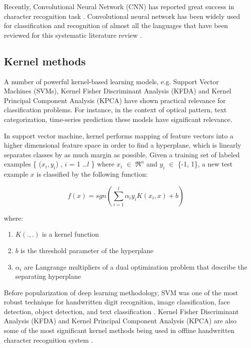 \documentclass{article}
\begin{document}
Recently, Convolutional Neural Network (CNN) has reported great success in character recognition task \cite{liu2005classification}. Convolutional neural network has been widely used for classification and recognition of almost all the languages that have been reviewed for this systematic literature review \cite{boufenar2018investigation,sokar2018generic,lin2018chinese,yang2018recognition,alizadehashraf2017persian,ghasemi2018persian}.





\subsection{Kernel methods}

A number of powerful kernel-based learning models, e.g. Support Vector Machines (SVMs), Kernel Fisher Discriminant Analysis (KFDA) and Kernel Principal Component Analysis (KPCA) have shown practical relevance for classification problems. For instance, in the context of optical pattern, text categorization, time-series prediction these models have significant relevance. 



In support vector machine, kernel performs mapping of feature vectors into a higher dimensional feature space in order to find a hyperplane, which is linearly separates classes by as much margin as possible. Given a training set of labeled examples \{ ($x_i, y_i$) , $i$ = 1 \dots $l$ \} where $x_i$ $\in$ $\Re^n$ and $y_i$ $\in$ \{-1, 1\}, a new test example $x$ is classified by the following function:


\begin{equation}
f(x)=sgn(\sum\limits_{i=1}^{l} \alpha_i y_i K(x_i,x)+b)
\end{equation}

where:
\begin {enumerate}
\item $K(.,.)$ is a kernel function
\item $b$ is the threshold parameter of the hyperplane
\item $\alpha_i$ are Langrange multipliers of a dual optimization problem that describe the separating hyperplane
\end {enumerate}


Before popularization of deep learning methodology, SVM was one of the most robust technique for handwritten digit recognition, image classification, face detection, object detection, and text classification \cite{boukharouba2017novel}. Kernel Fisher Discriminant Analysis (KFDA) and Kernel Principal Component Analysis (KPCA) are also some of the most significant kernel methods being used in offline handwritten character recognition system \cite{verma2012survey}.
\end{document}
